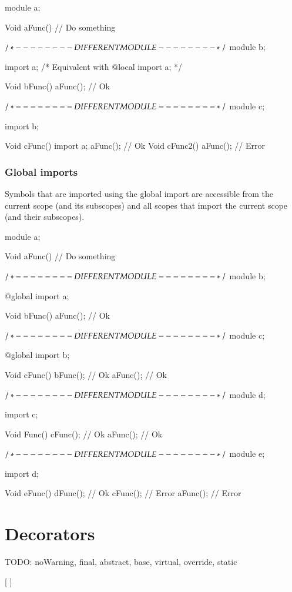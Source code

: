 \begin{code}
module a;

Void aFunc() {
	// Do something
}

$/* - - - - - - - - DIFFERENT MODULE - - - - - - - - */$
module b;

import a; /* Equivalent with @local import a; */

Void bFunc() {
	aFunc(); // Ok
}

$/* - - - - - - - - DIFFERENT MODULE - - - - - - - - */$
module c;

import b;

Void cFunc() {
	import a;
	aFunc(); // Ok
}
Void cFunc2() {
	aFunc(); // Error	
}
\end{code}

\subsection{Global imports} \label{decorator:global}
Symbols that are imported using the global import are accessible from the current scope (and its subscopes) and all scopes that import the current scope (and their subscopes).

\begin{code}
module a;

Void aFunc() {
	// Do something
}

$/* - - - - - - - - DIFFERENT MODULE - - - - - - - - */$
module b;

@global import a;

Void bFunc() {
	aFunc(); // Ok
}

$/* - - - - - - - - DIFFERENT MODULE - - - - - - - - */$
module c;

@global import b;

Void cFunc() {
	bFunc(); // Ok
	aFunc(); // Ok	
}

$/* - - - - - - - - DIFFERENT MODULE - - - - - - - - */$
module d;

import c;

Void Func() {
	cFunc(); // Ok
	aFunc(); // Ok
}

$/* - - - - - - - - DIFFERENT MODULE - - - - - - - - */$
module e;

import d;

Void eFunc() {
	dFunc(); // Ok
	cFunc(); // Error
	aFunc(); // Error	
}
\end{code}

\chapter{Decorators}
TODO: noWarning, final, abstract, base, virtual, override, static

\begin{grammar}
	   [  ]
\end{grammar}

